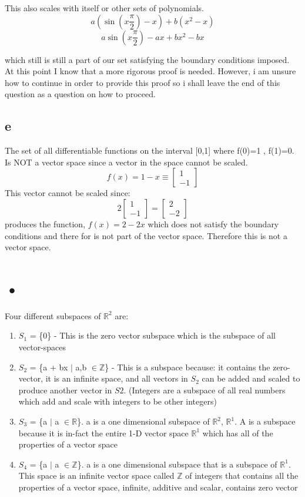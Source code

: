 \documentclass[12pt]{article}
\begin{document}
This also scales with itself or other sets of polynomials.\\


$$ a(\sin(x\frac{\pi}{2}) - x) + b(x^{2} - x) $$
$$ a\sin(x\frac{\pi}{2}) - ax + bx^{2} - bx $$

which still is still a part of our set satisfying the boundary conditions imposed.\\

At this point I know that a more rigorous proof is needed. However, i am unsure how to continue in order to provide this proof so i shall leave the end of this question as a question on how to proceed.

\subsection*{e}

The set of all differentiable functions on the interval [0,1] where f(0)=1 , f(1)=0.\\

Is NOT a vector space since a vector in the space cannot be scaled.
\[
f(x) = 1-x
\equiv
\begin{bmatrix}
1\\
-1
\end{bmatrix} 
\]
This vector cannot be scaled since:
\[
2
\begin{bmatrix}
1\\
-1
\end{bmatrix}
= 
\begin{bmatrix}
2\\
-2
\end{bmatrix}
\]
produces the function, $f(x) = 2-2x$ which does not satisfy the boundary conditions and there for is not part of the vector space. Therefore this is not a vector space.

\section{•}
Four different subspaces of $\mathbb{R}^{2}$ are:
\begin{enumerate}
\item $S_{1}$ = \{0\} - This is the zero vector subspace which is the subspace of all vector-spaces
\item $S_{2}$ = \{a + bx $|$ a,b $\in \mathbb{Z}$\} - This is a subspace because: it contains the zero-vector, it is an infinite space, and all vectors in $S_{2}$ can be added and scaled to produce another vector in $S{2}$. (Integers are a subspace of all real numbers which add and scale with integers to be other integers)
\item $S_{3}$ = \{a $|$ a $\in \mathbb{R}$\}. a is a one dimensional subspace of $\mathbb{R}^{2}$, $\mathbb{R}^{1}$. A is a subspace because it is in-fact the entire 1-D vector space $\mathbb{R}^{1}$ which has all of the properties of a vector space
\item $S_{4}$ = \{a $|$ a $\in \mathbb{Z}$\}. a is a one dimensional subspace that is a subspace of $\mathbb{R}^{1}$. This space is an infinite vector space called $\mathbb{Z}$ of integers that contains all the properties of a vector space, infinite, additive and scalar, contains zero vector
\end{enumerate}
\end{document}
